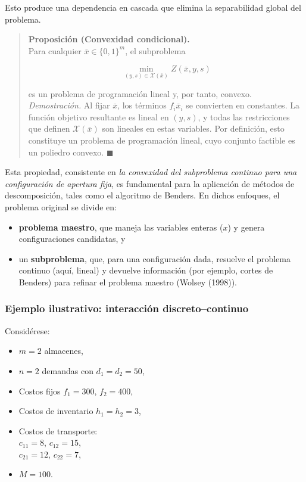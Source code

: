 \documentclass[
  spanish,
  us-letterpaper,
  DIV=11,
  numbers=noendperiod]{scrreprt}
\providecommand{\tightlist}{%
  \setlength{\itemsep}{0pt}\setlength{\parskip}{0pt}}
\numberwithin{equation}{section}
\begin{document}
Esto produce una dependencia en cascada que elimina la separabilidad
global del problema.

\begin{quote}
\textbf{Proposición (Convexidad condicional).}\\
Para cualquier \(\bar{x} \in \{0,1\}^m\), el subproblema

\[
\min_{(y,s) \in \mathcal{X}(\bar{x})} Z(\bar{x}, y, s)
\]

es un problema de programación lineal y, por tanto, convexo.\\
\emph{Demostración.} Al fijar \(\bar{x}\), los términos
\(f_i \bar{x}_i\) se convierten en constantes. La función objetivo
resultante es lineal en \((y,s)\), y todas las restricciones que definen
\(\mathcal{X}(\bar{x})\) son lineales en estas variables. Por
definición, esto constituye un problema de programación lineal, cuyo
conjunto factible es un poliedro convexo. \(\blacksquare\)
\end{quote}

Esta propiedad, consistente en \emph{la convexidad del subproblema
continuo para una configuración de apertura fija}, es fundamental para
la aplicación de métodos de descomposición, tales como el algoritmo de
Benders. En dichos enfoques, el problema original se divide en:

\begin{itemize}
\tightlist
\item
  \textbf{problema maestro}, que maneja las variables enteras (\(x\)) y
  genera configuraciones candidatas, y
\item
  un \textbf{subproblema}, que, para una configuración dada, resuelve el
  problema continuo (aquí, lineal) y devuelve información (por ejemplo,
  cortes de Benders) para refinar el problema maestro (Wolsey (1998)).
\end{itemize}

\subsubsection{Ejemplo ilustrativo: interacción
discreto--continuo}\label{ejemplo-ilustrativo-interacciuxf3n-discretocontinuo}

Considérese:

\begin{itemize}
\tightlist
\item
  \(m=2\) almacenes,\\
\item
  \(n=2\) demandas con \(d_1=d_2=50\),\\
\item
  Costos fijos \(f_1=300\), \(f_2=400\),\\
\item
  Costos de inventario \(h_1=h_2=3\),\\
\item
  Costos de transporte:\\
  \(c_{11}=8\), \(c_{12}=15\),\\
  \(c_{21}=12\), \(c_{22}=7\),\\
\item
  \(M=100\).
\end{itemize}
\end{document}
